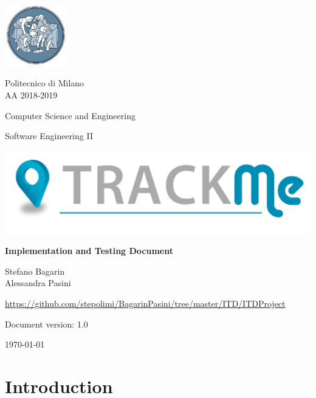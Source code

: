 \documentclass[a4paper,12pt]{report}
\begin{document}
	\begin{titlepage}
		\centering
		\includegraphics[width=0.20\textwidth]{./pictures/logo_polimi.png}\par

		{Politecnico di Milano \\ AA 2018-2019} \par
		\vspace{1.5cm}

		{Computer Science and Engineering}\par
		\Large{Software Engineering II}\par
		\vspace{1.0cm}

		\includegraphics[width=1.00\textwidth]{./pictures/logo_trackme.png}\par
		{\LARGE \textbf{Implementation and Testing Document} \par}
		\vspace{1.0cm}
		{\Large Stefano Bagarin\\ Alessandra Pasini\par}
		\vspace{2cm}
		{\Large \url{https://github.com/stepolimi/BagarinPasini/tree/master/ITD/ITDProject}}
		\vspace{2cm}
		\vfill

		{\large Document version: 1.0\par}
		{\large \today \par}
	\end{titlepage}

	\tableofcontents

	\chapter{Introduction}
	\label{ch:Introduction}
\end{document}
